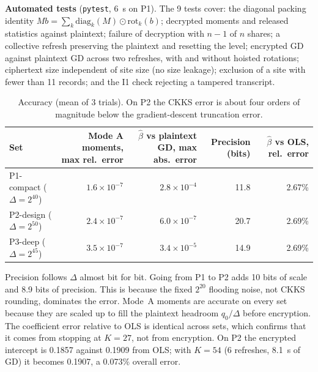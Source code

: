 \documentclass[11pt]{article}
\begin{document}
\textbf{Automated tests} (\texttt{pytest}, 6~s on P1). The 9 tests cover: the diagonal packing identity $M b=\sum_k \mathrm{diag}_k(M)\odot\mathrm{rot}_k(b)$; decrypted moments and released statistics against plaintext; failure of decryption with $n-1$ of $n$ shares; a collective refresh preserving the plaintext and resetting the level; encrypted GD against plaintext GD across two refreshes, with and without hoisted rotations; ciphertext size independent of site size (no size leakage); exclusion of a site with fewer than 11 records; and the I1 check rejecting a tampered transcript.

\begin{table}[H]
\centering\small
\caption{Accuracy (mean of 3 trials). On P2 the CKKS error is about four orders of magnitude below the gradient-descent truncation error.}\label{tab:acc}
\begin{tabularx}{\textwidth}{@{}lRRRR@{}}
\toprule
\textbf{Set} & \textbf{Mode A moments, max rel.\ error} & \textbf{$\hat\beta$ vs plaintext GD, max abs.\ error} & \textbf{Precision (bits)} & \textbf{$\hat\beta$ vs OLS, rel.\ error} \\
\midrule
P1-compact ($\Delta=2^{40}$) & $1.6\times10^{-7}$ & $2.8\times10^{-4}$ & 11.8 & 2.67\% \\
P2-design ($\Delta=2^{50}$) & $2.4\times10^{-7}$ & $6.0\times10^{-7}$ & 20.7 & 2.69\% \\
P3-deep ($\Delta=2^{45}$) & $3.5\times10^{-7}$ & $3.4\times10^{-5}$ & 14.9 & 2.69\% \\
\bottomrule
\end{tabularx}
\end{table}

Precision follows $\Delta$ almost bit for bit. Going from P1 to P2 adds 10 bits of scale and 8.9 bits of precision. This is because the fixed $2^{20}$ flooding noise, not CKKS rounding, dominates the error. Mode~A moments are accurate on every set because they are scaled up to fill the plaintext headroom $q_0/\Delta$ before encryption. The coefficient error relative to OLS is identical across sets, which confirms that it comes from stopping at $K=27$, not from encryption. On P2 the encrypted intercept is 0.1857 against 0.1909 from OLS; with $K=54$ (6 refreshes, 8.1~s of GD) it becomes 0.1907, a 0.073\% overall error.
\end{document}
